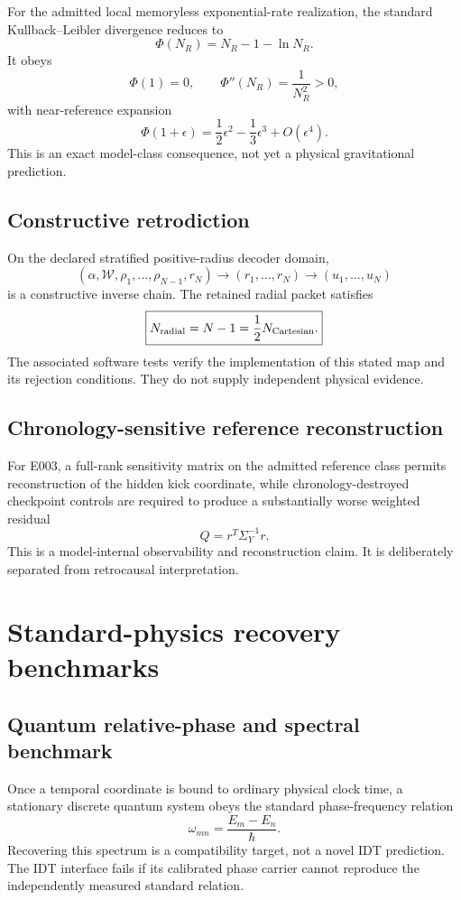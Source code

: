 For the admitted local memoryless exponential-rate realization, the standard Kullback--Leibler divergence \cite{KullbackLeibler1951} reduces to
\[
\boxed{
\Phi(N_R)=N_R-1-\ln N_R.
}
\]
It obeys
\[
\Phi(1)=0,
\qquad
\Phi''(N_R)=\frac{1}{N_R^2}>0,
\]
with near-reference expansion
\[
\Phi(1+\epsilon)=\frac12\epsilon^2-\frac13\epsilon^3+O(\epsilon^4).
\]
This is an exact model-class consequence, not yet a physical gravitational prediction.

\subsection{Constructive retrodiction}

On the declared stratified positive-radius decoder domain,
\[
(\alpha,\mathcal W,\rho_1,\ldots,\rho_{N-1},r_N)
\longrightarrow
(r_1,\ldots,r_N)
\longrightarrow
(u_1,\ldots,u_N)
\]
is a constructive inverse chain. The retained radial packet satisfies
\[
\boxed{
N_{\rm radial}=N-1
=\frac12N_{\rm Cartesian}.
}
\]
The associated software tests verify the implementation of this stated map and its rejection conditions. They do not supply independent physical evidence.

\subsection{Chronology-sensitive reference reconstruction}

For E003, a full-rank sensitivity matrix on the admitted reference class permits reconstruction of the hidden kick coordinate, while chronology-destroyed checkpoint controls are required to produce a substantially worse weighted residual
\[
Q=r^T\Sigma_Y^{-1}r.
\]
This is a model-internal observability and reconstruction claim. It is deliberately separated from retrocausal interpretation.

\section{Standard-physics recovery benchmarks}

\subsection{Quantum relative-phase and spectral benchmark}

Once a temporal coordinate is bound to ordinary physical clock time, a stationary discrete quantum system obeys the standard phase-frequency relation
\[
\boxed{
\omega_{mn}=\frac{E_m-E_n}{\hbar}.
}
\]
Recovering this spectrum is a compatibility target, not a novel IDT prediction. The IDT interface fails if its calibrated phase carrier cannot reproduce the independently measured standard relation.

